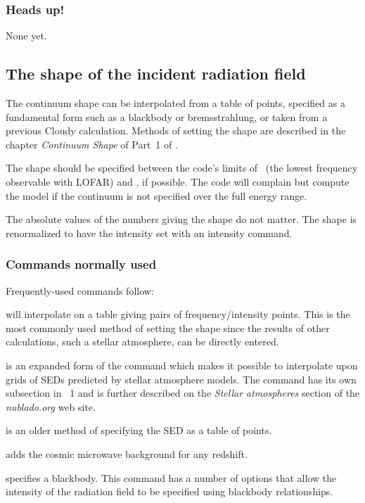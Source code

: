 \documentclass[12pt,twoside]{article}
\begin{document}
{\subsubsection{Heads up!}

None yet.

\subsection{The shape of the incident radiation field}

The continuum shape can be interpolated from a table of points, specified
as a fundamental form such as a blackbody or bremsstrahlung, or taken from
a previous Cloudy calculation.  Methods of setting the shape are described
in the chapter \emph{Continuum Shape} of Part~1 of \Hazy.

The shape should be specified between the code's limits of \emmmhz\
(the lowest frequency observable with LOFAR)
and \egamrymev, if possible.  The code will complain but compute
the model if the continuum is not specified over the full energy range.

The absolute values of the numbers giving the shape do not matter.  The
shape is renormalized to have the intensity set with an intensity command.

\subsubsection{Commands normally used}

Frequently-used commands follow:

 will interpolate on a table giving
pairs of frequency/intensity points.  This is the most commonly used method
of setting the shape since the results of other calculations,
such a stellar atmosphere, can be directly entered.

 is an expanded form of the  command
which makes it possible to interpolate upon grids of SEDs predicted by stellar atmosphere models.
The command has its own subsection in \Hazy\ 1 and is further described on the \emph{Stellar atmospheres}
section of the \emph{nublado.org} web site.

 is an older method of specifying
the SED as a table of points.

 adds the cosmic microwave background for any redshift.

 specifies a blackbody.
This command has a number of options
that allow the intensity of the radiation field to be specified using
blackbody relationships.

}
\end{document}
